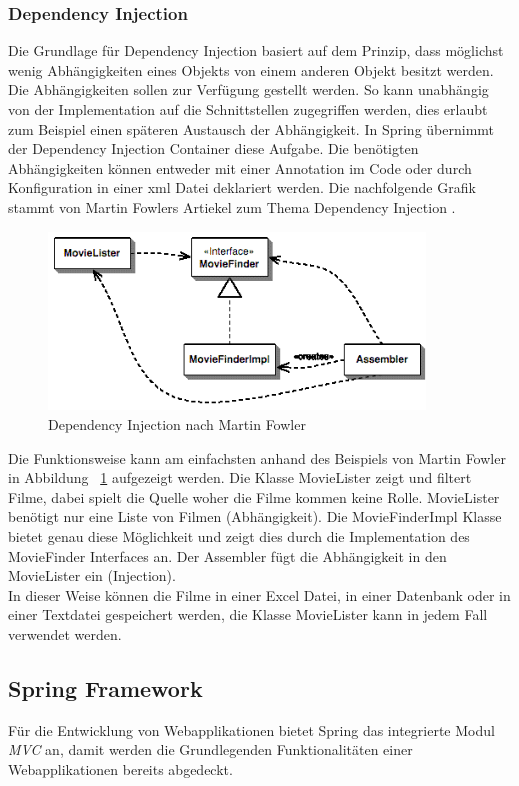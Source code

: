 \subsubsection{Dependency Injection}
Die Grundlage für Dependency Injection basiert auf dem Prinzip, dass möglichst wenig Abhängigkeiten eines Objekts von einem anderen Objekt besitzt werden. Die Abhängigkeiten sollen zur Verfügung gestellt werden. So kann unabhängig von der Implementation auf die Schnittstellen zugegriffen werden, dies erlaubt zum Beispiel einen späteren Austausch der Abhängigkeit. In Spring übernimmt der Dependency Injection Container diese Aufgabe. Die benötigten Abhängigkeiten können entweder mit einer Annotation im Code oder durch Konfiguration in einer xml Datei deklariert werden. Die nachfolgende Grafik stammt von Martin Fowlers Artiekel zum Thema Dependency Injection \cite{martinfowler2004}.
\begin{figure}[H]
	\centering
	\includegraphics[width=100mm]{images/tourliveweb/dependencyinjection.png}
	\caption{Dependency Injection nach Martin Fowler}
	\label{fig:dpendencyinjection}
\end{figure}
Die Funktionsweise kann am einfachsten anhand des Beispiels von Martin Fowler in Abbildung ~\ref{fig:dpendencyinjection} aufgezeigt werden. Die Klasse MovieLister zeigt und filtert Filme, dabei spielt die Quelle woher die Filme kommen keine Rolle. MovieLister benötigt nur eine Liste von Filmen (Abhängigkeit). Die MovieFinderImpl Klasse bietet genau diese Möglichkeit und zeigt dies durch die Implementation des MovieFinder Interfaces an. Der Assembler fügt die Abhängigkeit in den MovieLister ein (Injection).
\\
In dieser Weise können die Filme in einer Excel Datei, in einer Datenbank oder in einer Textdatei gespeichert werden, die Klasse MovieLister kann in jedem Fall verwendet werden.

\subsection{Spring Framework}
Für die Entwicklung von Webapplikationen bietet Spring das integrierte Modul \textit{MVC} an, damit werden die Grundlegenden Funktionalitäten einer Webapplikationen bereits abgedeckt.

